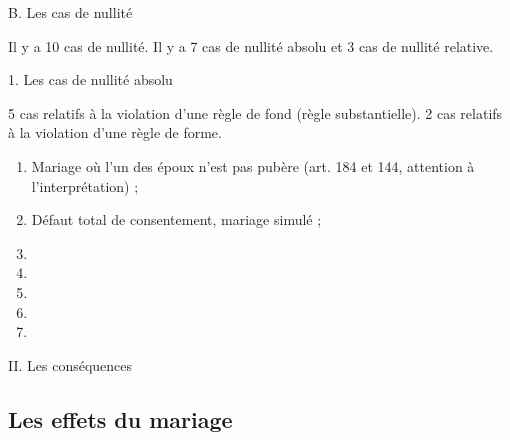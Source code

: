 \documentclass[12pt, a4paper, openany]{book}
\begin{document}
B. Les cas de nullité


Il y a 10 cas de nullité. Il y a 7 cas de nullité absolu et 3 cas de nullité relative. 


1. Les cas de nullité absolu


5 cas relatifs à la violation d'une règle de fond (règle substantielle). 
2 cas relatifs à la violation d'une règle de forme. 

\begin{enumerate}
\item Mariage où l'un des époux n'est pas pubère (art. 184 et 144, attention à l'interprétation) ;
\item Défaut total de consentement, mariage simulé ;
\item
\item
\item 
\item
\item
\end{enumerate}




II. Les conséquences




\subsection{Les effets du mariage}
\end{document}
